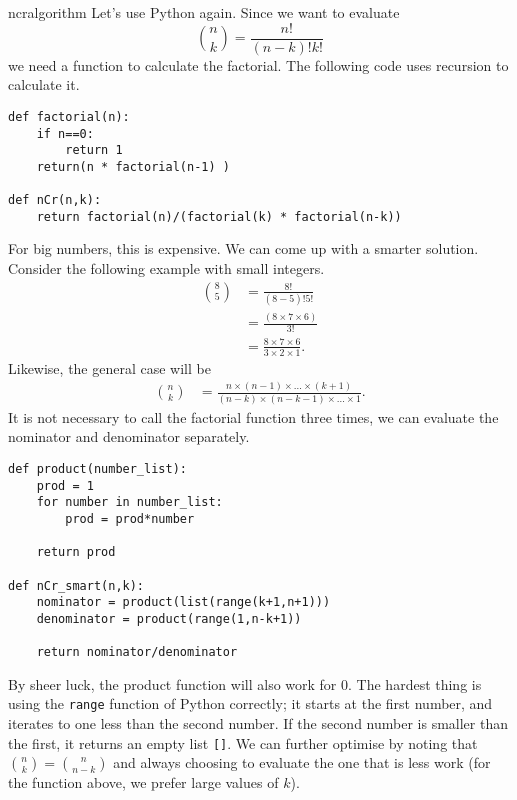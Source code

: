 \begin{answer}{ncralgorithm}
Let's use Python again.
Since we want to evaluate
\[
\binom{n}{k} = \frac{n!}{ (n-k)! k! }
\]
we need a function to calculate the factorial.
The  following code uses recursion to calculate it.
\begin{verbatim}
def factorial(n):
    if n==0:
        return 1
    return(n * factorial(n-1) )

def nCr(n,k):
    return factorial(n)/(factorial(k) * factorial(n-k))
\end{verbatim}
For big numbers, this is expensive.
We can come up with a smarter solution.
Consider the following example with small integers.
\begin{align*}
\binom{8}{5} &= \frac{8!}{ (8-5)! 5! } \\
             &= \frac{(8 \times 7 \times 6 )}{3!} \\
             &= \frac{8 \times 7 \times 6 }{  3 \times 2 \times 1 }
\text{.}
\end{align*}
Likewise, the general case will be
\begin{align*}
\binom{n}{k}
             &= \frac{n \times (n-1) \times  \ldots \times (k+1) }{ (n-k) \times (n-k-1) \times \ldots \times 1 }
\text{.}
\end{align*}
It is not necessary to call the factorial function three times,
we can evaluate the nominator and denominator separately.

\begin{verbatim}
def product(number_list):
    prod = 1
    for number in number_list:
        prod = prod*number

    return prod

def nCr_smart(n,k):
    nominator = product(list(range(k+1,n+1)))
    denominator = product(range(1,n-k+1))

    return nominator/denominator
\end{verbatim}
By sheer luck, the product function will also work for $0$.
The hardest thing is using the \verb+range+ function of Python correctly; it starts at the first number, and iterates to one less than the second number.
If the second number is smaller than the first, it returns an empty list \verb+[]+.
We can further optimise by noting that $\binom{n}{k}=\binom{n}{n-k}$ and always choosing to evaluate the one that is less work (for the function above, we prefer large values of $k$).
\end{answer}
